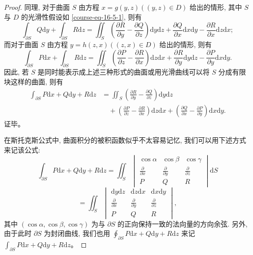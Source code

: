 \documentclass[UTF8,12pt,a4paper,fontset=fandol]{ctexart}
\begin{document}
\begin{proof}
同理, 对于曲面 $S$ 由方程 $x=g(y,z)((y,z)\in D)$ 给出的情形, 其中 $S$ 与 $D$ 的光滑性假设如 \eqref{course-eq-16-5-1}, 则有
\[
  \int_{\partial S}Q\mathrm dy+\int_{\partial S}R\mathrm dz
  =\iint_S\left(\frac{\partial R}{\partial y}-\frac{\partial Q}{\partial z}\right)\mathrm dy\mathrm dz
    +\frac{\partial Q}{\partial x}\mathrm dx\mathrm dy-\frac{\partial R}{\partial x}\mathrm dz\mathrm dx;
\]
而对于曲面 $S$ 由方程 $y=h(z,x)((z,x)\in D)$ 给出的情形, 则有
\[
  \int_{\partial S}P\mathrm dx+\int_{\partial S}R\mathrm dz
  =\iint_S\left(\frac{\partial P}{\partial z}-\frac{\partial R}{\partial x}\right)\mathrm dz\mathrm dx
    +\frac{\partial R}{\partial y}\mathrm dy\mathrm dz-\frac{\partial P}{\partial y}\mathrm dx\mathrm dy.
\]
因此, 若 $S$ 是同时能表示成上述三种形式的曲面或用光滑曲线可以将 $S$ 分成有限块这样的曲面, 则有
\[
\begin{aligned}
  \int_{\partial S}P\mathrm dx+Q\mathrm dy+R\mathrm dz
  &=\iint_S\left(\frac{\partial R}{\partial y}-\frac{\partial Q}{\partial z}\right)\mathrm dy\mathrm dz\\
  &\quad+\left(\frac{\partial P}{\partial z}-\frac{\partial R}{\partial x}\right)\mathrm dz\mathrm dx
    +\left(\frac{\partial Q}{\partial x}-\frac{\partial P}{\partial y}\right)\mathrm dx\mathrm dy.
\end{aligned}
\]
证毕。

在斯托克斯公式中, 曲面积分的被积函数似乎不太容易记忆, 我们可以用下述方式来记该公式:
\[
  \int_{\partial S}P\mathrm dx+Q\mathrm dy+R\mathrm dz
  =\iint_S
  \begin{vmatrix}
    \cos\alpha&\cos\beta&\cos\gamma\\
    \frac{\partial}{\partial x}&\frac{\partial}{\partial y}&\frac{\partial}{\partial z}\\
    P&Q&R
  \end{vmatrix}\mathrm dS
\]
\[
  =\iint_S
  \begin{vmatrix}
    \mathrm dy\mathrm dz&\mathrm dz\mathrm dx&\mathrm dx\mathrm dy\\
    \frac{\partial}{\partial x}&\frac{\partial}{\partial y}&\frac{\partial}{\partial z}\\
    P&Q&R
  \end{vmatrix},
\]
其中 $(\cos\alpha,\cos\beta,\cos\gamma)$ 为与 $\partial S$ 的正向保持一致的法向量的方向余弦. 另外, 由于此时 $\partial S$ 为封闭曲线, 我们也用 $\oint_{\partial S}P\mathrm dx+Q\mathrm dy+R\mathrm dz$ 来记 $\int_{\partial S}P\mathrm dx+Q\mathrm dy+R\mathrm dz$。

\end{proof}
\end{document}
